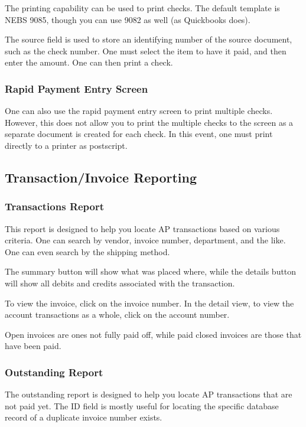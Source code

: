 \documentclass{article}
\begin{document}
The printing capability can be used to print checks.  The default template is
NEBS 9085, though you can use 9082 as well (as Quickbooks does).

The source field is used to store an identifying number of the source document,
such as the check number.  One must select the item to have it paid, and then
enter the amount.  One can then print a check.

\subsubsection{Rapid Payment Entry Screen}

One can also use the rapid payment entry screen to print multiple checks.
However, this does not allow you to print the multiple checks to the screen as a
separate document is created for each check.  In this event, one must print
directly to a printer as postscript.

\subsection{Transaction/Invoice Reporting}
\subsubsection{Transactions Report}

This report is designed to help you locate AP transactions based on various
criteria.  One can search by vendor, invoice number, department, and the like.
One can even search by the shipping method.

The summary button will show what was placed where, while the details button
will show all debits and credits associated with the transaction.

To view the invoice, click on the invoice number.  In the detail view, to view
the account transactions as a whole, click on the account number.

Open invoices are ones not fully paid off, while paid closed invoices are those
that have been paid.

\subsubsection{Outstanding Report}
The outstanding report is designed to help you locate AP transactions that are
not paid yet.  The ID field is mostly useful for locating the specific database
record of a duplicate invoice number exists.
\end{document}
